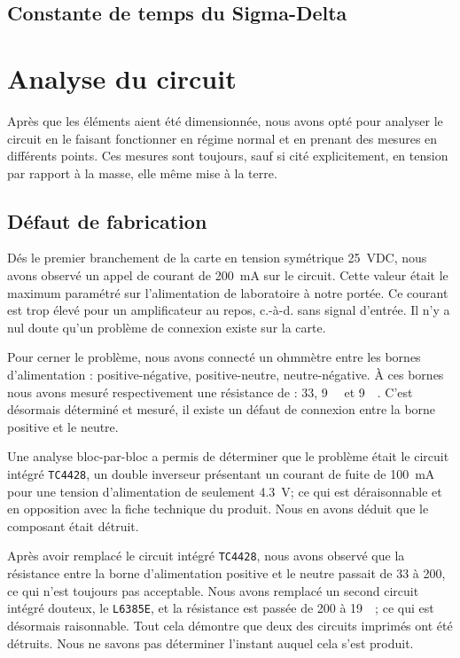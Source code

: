 \documentclass[10pt, oneside, a4paper]{article}
\begin{document}
\subsection{Constante de temps du Sigma-Delta}

\section{Analyse du circuit}
Après que les éléments aient été dimensionnée, nous avons opté pour analyser le circuit en le faisant fonctionner en régime normal et en prenant des mesures en différents points.
Ces mesures sont toujours, sauf si cité explicitement, en tension par rapport à la masse, elle même mise à la terre.

\subsection{Défaut de fabrication}
Dés le premier branchement de la carte en tension symétrique \pm\SI{25}{\volt}DC,
nous avons observé un appel de courant de \SI{200}{\milli\ampere} sur le circuit.
Cette valeur était le maximum paramétré sur l'alimentation de laboratoire à notre portée.
Ce courant est trop élevé pour un amplificateur au repos, c.-à-d. sans signal d'entrée.
Il n'y a nul doute qu'un problème de connexion existe sur la carte.

Pour cerner le problème, nous avons connecté un ohmmètre entre les bornes d'alimentation : positive-négative, positive-neutre, neutre-négative.
À ces bornes nous avons mesuré respectivement une résistance de : \SI{33}{\Omega}, \SI{9}{\kilo\Omega} et \SI{9}{\kilo\Omega}.
C'est désormais déterminé et mesuré, il existe un défaut de connexion entre la borne positive et le neutre.

Une analyse bloc-par-bloc a permis de déterminer que le problème était le circuit intégré \verb|TC4428|, un double inverseur présentant un courant de fuite de \SI{100}{\milli\ampere} pour une tension d'alimentation de seulement \SI{4.3}{\volt};
ce qui est déraisonnable et en opposition avec la fiche technique du produit.
Nous en avons déduit que le composant était détruit.

Après avoir remplacé le circuit intégré \verb|TC4428|, nous avons observé que la résistance entre la borne d'alimentation positive et le neutre passait de \SI{33}{\Omega} à \SI{200}{\Omega}, ce qui n'est toujours pas acceptable.
Nous avons remplacé un second circuit intégré douteux, le \verb|L6385E|, et la résistance est passée de \SI{200}{\Omega} à \SI{19}{\kilo\Omega}; ce qui est désormais raisonnable.
Tout cela démontre que deux des circuits imprimés ont été détruits.
Nous ne savons pas déterminer l'instant auquel cela s'est produit.
\end{document}
